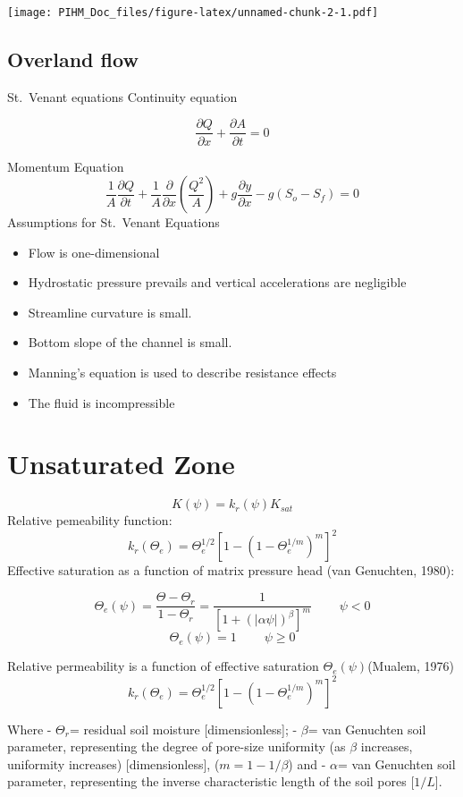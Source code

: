 \documentclass[]{scrbook}
\providecommand{\tightlist}{%
  \setlength{\itemsep}{0pt}\setlength{\parskip}{0pt}}
\begin{document}
\texttt{[image: PIHM\_Doc\_files/figure-latex/unnamed-chunk-2-1.pdf]}

\section{Overland flow}\label{overland-flow}

St.~Venant equations Continuity equation

\[ \frac{\partial Q}{\partial x}+\frac{\partial A}{\partial t}=0 \]

Momentum Equation
\[ \frac{1}{A} \frac{\partial Q}{\partial t}+\frac{1}{A} \frac{\partial}{\partial x}\left(\frac{Q^{2}}{A}\right)+g \frac{\partial y}{\partial x}-g\left(S_{o}-S_{f}\right)=0 \]
Assumptions for St.~Venant Equations

\begin{itemize}
\tightlist
\item
  Flow is one-dimensional
\item
  Hydrostatic pressure prevails and vertical accelerations are
  negligible
\item
  Streamline curvature is small.
\item
  Bottom slope of the channel is small.
\item
  Manning's equation is used to describe resistance effects
\item
  The fluid is incompressible
\end{itemize}

\chapter{Unsaturated Zone}\label{unsat}

\[K(\psi)=k_{r}(\psi) K_{s a t}\] Relative pemeability function:
\[k_{r}\left(\Theta_{e}\right)=\Theta_{e}^{1 / 2}\left[1-\left(1-\Theta_{e}^{1 / m}\right)^{m}\right]^{2}\]
Effective saturation as a function of matrix pressure head (van
Genuchten, 1980):

\[\Theta_{e}(\psi)=\frac{\Theta-\Theta_{r}}{1-\Theta_{r}}=\frac{1}{[1+(|\alpha \psi|)^{\beta}] ^ m}  ~~~~~~~~~~ \psi<0\]
\[\Theta_{e}(\psi)={1}  ~~~~~~~~~~ \psi \geq 0\]

Relative permeability is a function of effective saturation
\(\Theta_{e}(\psi)\)(Mualem, 1976)
\[k_{r}\left(\Theta_{e}\right)=\Theta_{e}^{1 / 2}\left[1-\left(1-\Theta_{e}^{1 / m}\right)^{m}\right]^{2}\]

Where - \(\Theta_{r}\)= residual soil moisture {[}dimensionless{]}; -
\(\beta\)= van Genuchten soil parameter, representing the degree of
pore-size uniformity (as \(\beta\) increases, uniformity increases)
{[}dimensionless{]}, (\(m = 1-1/\beta\)) and - \(\alpha\)= van Genuchten
soil parameter, representing the inverse characteristic length of the
soil pores {[}\(1/L\){]}.
\end{document}
